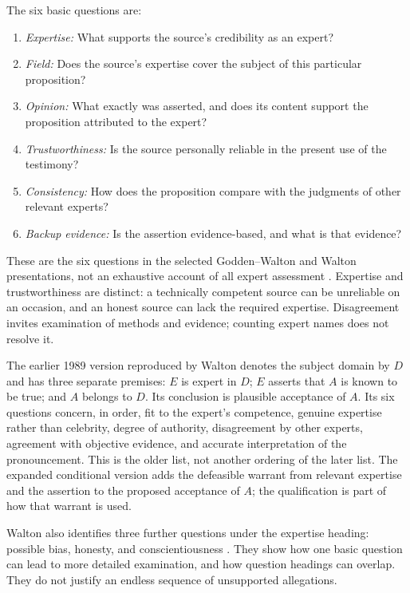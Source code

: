 The six basic questions are:

\begin{enumerate}
\item \emph{Expertise:} What supports the source's credibility as an expert?
\item \emph{Field:} Does the source's expertise cover the subject of this
particular proposition?
\item \emph{Opinion:} What exactly was asserted, and does its content
support the proposition attributed to the expert?
\item \emph{Trustworthiness:} Is the source personally reliable in the
present use of the testimony?
\item \emph{Consistency:} How does the proposition compare with the
judgments of other relevant experts?
\item \emph{Backup evidence:} Is the assertion evidence-based, and
what is that evidence?
\end{enumerate}

These are the six questions in the selected Godden--Walton and Walton
presentations, not an exhaustive account of all expert assessment
\cite[pp.~278--279]{GoddenWalton2007SchemesQuestions}
\cite[pp.~130--134]{Walton2016ArgumentEvaluation}.
Expertise and trustworthiness are distinct: a technically competent source
can be unreliable on an occasion, and an honest source can lack the
required expertise. Disagreement invites examination of methods and
evidence; counting expert names does not resolve it.

The earlier 1989 version reproduced by Walton denotes the subject domain
by \(D\) and has three separate premises: \(E\) is expert in \(D\);
\(E\) asserts that \(A\) is known
to be true; and \(A\) belongs to \(D\). Its conclusion is plausible
acceptance of \(A\). Its six questions concern, in order, fit to the
expert's competence, genuine expertise rather than celebrity, degree
of authority, disagreement by other experts, agreement with objective
evidence, and accurate interpretation of the pronouncement.
This is the older list, not another ordering of the later list.
The expanded conditional version adds the defeasible warrant from
relevant expertise and the assertion to the proposed acceptance of
\(A\); the qualification is part of how that warrant is used.

Walton also identifies three further questions under the expertise
heading: possible bias, honesty, and conscientiousness
\cite[pp.~129--132]{Walton2016ArgumentEvaluation}.
They show how one basic question can lead to more detailed examination,
and how question headings can overlap. They do not justify an endless
sequence of unsupported allegations.

